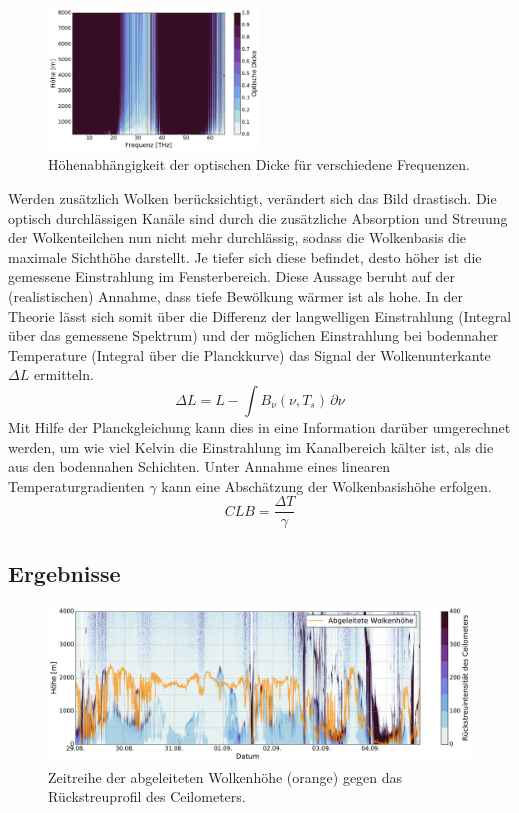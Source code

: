 \documentclass[10pt,a4paper,compsoc,peer review papers]{IEEEtran}
\begin{document}
\begin{figure}[ht]
  \centering
  \includegraphics[width=0.5\textwidth]{figures/midlatitude-summer_window.pdf}
  \caption{Höhenabhängigkeit der optischen Dicke für verschiedene Frequenzen.}
  \label{fig:lwr_window}
\end{figure}

Werden zusätzlich Wolken berücksichtigt, verändert sich das Bild drastisch. Die 
optisch durchlässigen Kanäle sind durch die zusätzliche Absorption und Streuung 
der Wolkenteilchen nun nicht mehr durchlässig, sodass die Wolkenbasis die 
maximale Sichthöhe darstellt. Je tiefer sich diese befindet, desto höher ist die 
gemessene Einstrahlung im Fensterbereich. Diese Aussage beruht auf der 
(realistischen) Annahme, dass tiefe Bewölkung wärmer ist als hohe. In der 
Theorie lässt sich somit über die Differenz der langwelligen Einstrahlung 
(Integral über das gemessene Spektrum) und der möglichen Einstrahlung bei 
bodennaher Temperature (Integral über die Planckkurve) das Signal der 
Wolkenunterkante $\Delta L$ ermitteln.
\begin{equation}\label{eq:delta_t}
  \Delta L = L - \int B_\nu(\nu, T_s)\,\partial\nu
\end{equation}
Mit Hilfe der Planckgleichung kann dies in eine Information darüber umgerechnet 
werden, um wie viel Kelvin die Einstrahlung im Kanalbereich kälter ist, als die 
aus den bodennahen Schichten. Unter Annahme eines linearen Temperaturgradienten 
$\gamma$ kann eine Abschätzung der Wolkenbasishöhe erfolgen.
\begin{equation}\label{eq:clb}
  CLB = \frac{\Delta T}{\gamma}
\end{equation}

\subsection{Ergebnisse}\label{subsec:clb_ergebnisse}

\begin{figure}[ht]
  \centering
  \includegraphics[width=\textwidth]{figures/clb.pdf}
  \caption{Zeitreihe der abgeleiteten Wolkenhöhe (orange) gegen das
  Rückstreuprofil des Ceilometers.}
  \label{fig:clb_zeitreihe}
\end{figure}
\end{document}
